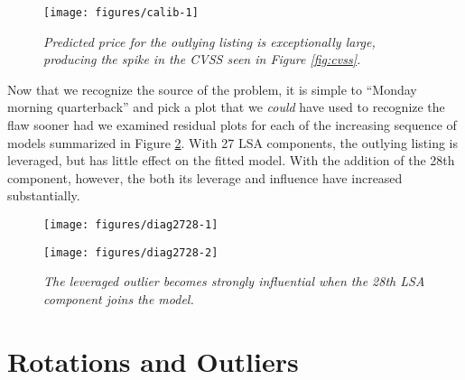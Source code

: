 \documentclass[12pt]{article}\usepackage[]{graphicx}\usepackage[]{color}
\newenvironment{knitrout}{}{} %
\begin{document}
\begin{figure}
\begin{knitrout}
\color{fgcolor}

{\centering \texttt{[image: figures/calib-1]} 

}



\end{knitrout}
\caption{ \label{fig:calib}
 {\sl Predicted price for the outlying listing is exceptionally large,
 producing the spike in the CVSS seen in Figure \ref{fig:cvss}.}}
\end{figure}


 Now that we recognize the source of the problem, it is simple to
 ``Monday morning quarterback'' and pick a plot that we {\em could}
 have used to recognize the flaw sooner had we examined residual plots
 for each of the increasing sequence of models summarized in Figure
 \ref{fig:diag2}.  With 27 LSA components, the outlying listing is
 leveraged, but has little effect on the fitted model.  With the
 addition of the 28th component, however, the both its leverage and
 influence have increased substantially.


\begin{figure}
\begin{knitrout}
\color{fgcolor}

{\centering \texttt{[image: figures/diag2728-1]} 

}




{\centering \texttt{[image: figures/diag2728-2]} 

}



\end{knitrout}
\caption{ \label{fig:diag2}
  {\sl The leveraged outlier becomes strongly influential when the 28th
       LSA component joins the model.}  }
\end{figure}


\section{Rotations and Outliers}
\label{sec:rotation}
\end{document}
